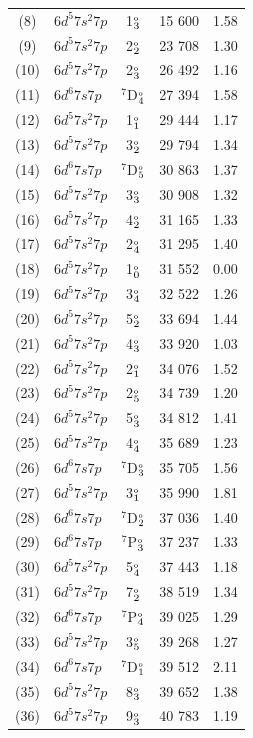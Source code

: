 \documentclass[10pt,a4paper, twoside, openright]{report}
\begin{document}
{\begin{longtable}{cl@{\hspace{0.5cm}}c@{\hspace{0.5cm}}r@{\hspace{0.5cm}}r}
  (8) &  $6d^5 7s^2 7p$  & 1$_3^{\rm_o}$     & 15 600 & 1.58  \\ 
 (9) &  $6d^5 7s^2 7p$  & 2$_2^{\rm_o}$  & 23 708 & 1.30  \\ 
 (10) &  $6d^5 7s^2 7p$  & 2$_3^{\rm_o}$     & 26 492 & 1.16  \\ 
(11) &   $6d^6 7s 7p$  &  $^7$D$_{4}^{\rm_o}$   & 27 394 & 1.58  \\  
(12) &   $6d^5 7s^2 7p$  &  1$_1^{\rm_o}$   & 29 444 & 1.17  \\  
(13) &    $6d^5 7s^2 7p$  &  3$_2^{\rm_o}$    & 29 794 & 1.34  \\ 
(14) &   $6d^6 7s 7p$  &  $^7$D$_5^{\rm_o}$    &30 863 & 1.37   \\  
(15) &  $6d^5 7s^2 7p$  & 3$_3^{\rm_o}$     & 30 908 & 1.32  \\ 
(16) &   $6d^5 7s^2 7p$  & 4$_2^{\rm_o}$    & 31 165 & 1.33 \\ 
(17) &   $6d^5 7s^2 7p$  & 2$_4^{\rm_o}$      & 31 295 & 1.40   \\  
(18) &  $6d^5 7s^2 7p$  & 1$_0^{\rm_o}$  & 31 552 & 0.00  \\ 
(19) &  $6d^5 7s^2 7p$ & 3$_4^{\rm_o}$     & 32 522 & 1.26  \\ 
(20) &  $6d^5 7s^2 7p$ & 5$_2^{\rm_o}$   & 33 694 & 1.44  \\ 
(21) &  $6d^5 7s^2 7p$ & 4$_3^{\rm_o}$     & 33 920 & 1.03 \\ 
(22) &  $6d^5 7s^2 7p$ & 2$_1^{\rm_o}$      & 34 076 & 1.52 \\ 
(23) &  $6d^5 7s^2 7p$  & 2$_5^{\rm_o}$     & 34 739 & 1.20 \\ 
(24) &  $6d^5 7s^2 7p$ & 5$_3^{\rm_o}$   & 34 812 & 1.41 \\
(25) &  $6d^5 7s^2 7p$ & 4$_4^{\rm_o}$   & 35 689 & 1.23 \\ 
(26) &  $6d^6 7s 7p$  &  $^7$D$_{3}^{\rm_o}$  & 35 705 & 1.56 \\ 
(27) &  $6d^5 7s^2 7p$  & 3$_1^{\rm_o}$   & 35 990 & 1.81 \\ 
(28) &  $6d^6 7s 7p$  &  $^7$D$_2^{\rm_o}$  & 37 036 & 1.40 \\ 
(29) &  $6d^6 7s 7p$  & $^7$P$_{3}^{\rm_o}$ & 37 237 & 1.33 \\ 
(30) &  $6d^5 7s^2 7p$ & 5$_4^{\rm_o}$   & 37 443 & 1.18 \\ 
(31) &  $6d^5 7s^2 7p$ & 7$_2^{\rm_o}$   & 38 519 & 1.34 \\
(32) &  $6d^6 7s 7p$  &  $^7$P$_{4}^{\rm_o}$ & 39 025 & 1.29 \\ 
(33) &  $6d^5 7s^2 7p$  & 3$_5^{\rm_o}$   & 39 268 & 1.27 \\
(34) &  $6d^6 7s 7p$  &  $^7$D$_1^{\rm_o}$  & 39 512 & 2.11 \\ 
(35) &  $6d^5 7s^2 7p$  & 8$_3^{\rm_o}$  & 39 652 & 1.38 \\ 
(36) &  $6d^5 7s^2 7p $  & 9$_3^{\rm_o}$    &  40 783  &  1.19 \\
  \bottomrule
 \bottomrule
 \end{longtable} 
 }
\end{document}
